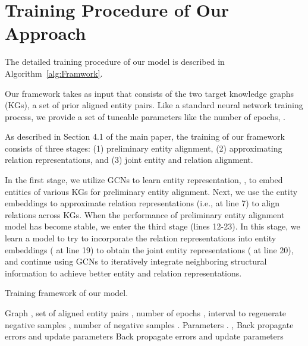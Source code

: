 \documentclass[11pt,a4paper]{article}
\begin{document}



\appendix
\section{Training Procedure of Our Approach}
\label{sec:appendix}

The detailed training procedure of our model is described in Algorithm~\ref{alg:Framwork}. 


Our framework takes as input  that consists of the two target knowledge graphs (KGs), a set of prior aligned entity pairs. Like a standard neural network training process, we provide a set of tuneable parameters like the number of epochs, . 

As described in Section 4.1 of the main paper, the training of our framework consists of three stages: (1) preliminary entity alignment, (2) approximating relation representations, and (3) joint entity and relation alignment. 

In the first stage, we utilize GCNs to learn entity representation, , to embed entities of various KGs for preliminary entity alignment.
Next, we use the entity embeddings to
approximate relation representations (i.e.,  at line 7) to align relations across KGs. When the performance of preliminary entity alignment model has become stable, we enter the third stage (lines 12-23). In this stage, we learn a model to try to incorporate the relation representations into entity embeddings ( at line 19) to obtain the joint entity representations ( at line 20), and continue using GCNs to iteratively integrate neighboring structural information to achieve better entity and relation representations.

\begin{algorithm}[t!]
\small
	\caption{ Training framework of our model.}
	\label{alg:Framwork}
	\begin{algorithmic}[1]
		\Require
		Graph , set of aligned entity pairs , number of epochs , interval to regenerate negative samples , number of negative samples .
		\Ensure
		Parameters .
		\State , 
		\While{}
		\State 
		\If{}
		\State 
		\EndIf
		\State 
		\State 
		\State Back propagate errors and update parameters 
		\State 
		\EndWhile
		\State 
		\While{}
		\State 
		\If{}
		\State 
		\EndIf
		\State 
		\State 
		\State 
		\State Back propagate errors and update parameters 
		\State 
		\EndWhile
		\State \Return 
	\end{algorithmic}
\end{algorithm}
\end{document}
